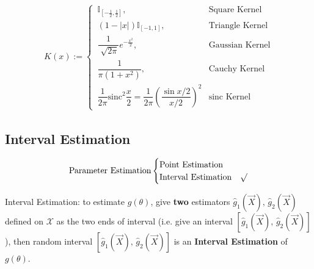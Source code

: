     
    \begin{align*}
        K(x):=\begin{cases}
            \,\mathbb{I}_{[-\frac{1}{2},\frac{1}{2}]},&\text{Square Kernel}\\
            \,(1-|x|)\mathbb{I}_{[-1,1]},&\text{Triangle Kernel}\\
            \,\dfrac{1}{\sqrt[]{2\pi}}e^{-\frac{x^2}{2}},&\text{Gaussian Kernel}\\
            \,\dfrac{1}{\pi(1+x^2)},&\text{Cauchy Kernel}\\
            \,\dfrac{1}{2\pi}\mathrm{sinc}^2\dfrac{x}{2}=\dfrac{1}{2\pi}\left(\dfrac{\sin x/2}{x/2}\right)^2&\text{sinc Kernel}
        \end{cases} 
    \end{align*}
    








\subsection{Interval Estimation}\label{SectionIntervalEstimation}
\begin{equation}
    \text{Parameter Estimation}\begin{cases}
        \text{Point Estimation}& \\
        \text{Interval Estimation}& \surd
    \end{cases}    
\end{equation}

    Interval Estimation: to estimate $g(\theta)$, give \textbf{two} estimators $\hat{g}_1(\vec{X}),\, \hat{g}_2(\vec{X})$ defined on $\mathscr{X}$ as the two ends of interval (i.e. give an interval $[\hat{g}_1(\vec{X}),\, \hat{g}_2(\vec{X})]$), then random interval $[\hat{g}_1(\vec{X}),\, \hat{g}_2(\vec{X})]$ is an \textbf{Interval Estimation} of $g(\theta)$. 


    

